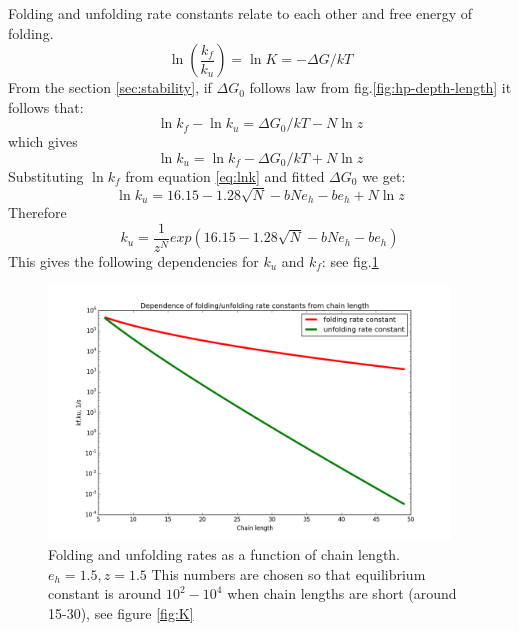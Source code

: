 \documentclass[12pt]{paper}
\newcommand{\gD}{\Delta}
\newcommand{\pt}[1]{\left( #1\right)}
\begin{document}
Folding and unfolding rate constants relate to each other and free energy of folding.
\begin{equation}
 \ln\pt{\frac{k_f}{k_u}}=\ln K=-\gD G/kT
\end{equation} 
From the section \ref{sec:stability}, if $\gD G_0$ follows law from fig.\ref{fig:hp-depth-length}  
it follows that:
\begin{equation}
\ln k_f-\ln k_u=\gD G_0/kT-N\ln z%
\end{equation} 
which gives
\begin{equation}
\ln k_u = \ln k_f -\gD G_0/kT+N\ln z 
\end{equation} 
Substituting $\ln k_f $ from equation \eqref{eq:lnk} and fitted $\gD G_0$ we get:
\begin{equation}
\ln k_u = 16.15-1.28 \sqrt{N} -bNe_h -be_h+N\ln z
\end{equation} 
Therefore
\begin{equation}
k_u = \frac{1}{z^N}exp(16.15-1.28 \sqrt{N} -bNe_h -be_h)
\end{equation} 
This gives the following dependencies for $k_u$ and $k_f$: see fig.\ref{fig:k_unf_N}
\begin{figure}[h!]
  \centering
  \includegraphics[width=0.95\textwidth]{pictures/kf-ku.png} 
  \caption{Folding and unfolding rates as a function of chain length. $e_h=1.5,z=1.5$ This numbers 
are chosen so that equilibrium constant is around $10^2-10^4$ when chain lengths are short (around 
15-30), see figure \ref{fig:K}}
  \label{fig:k_unf_N}
\end{figure}
\end{document}
